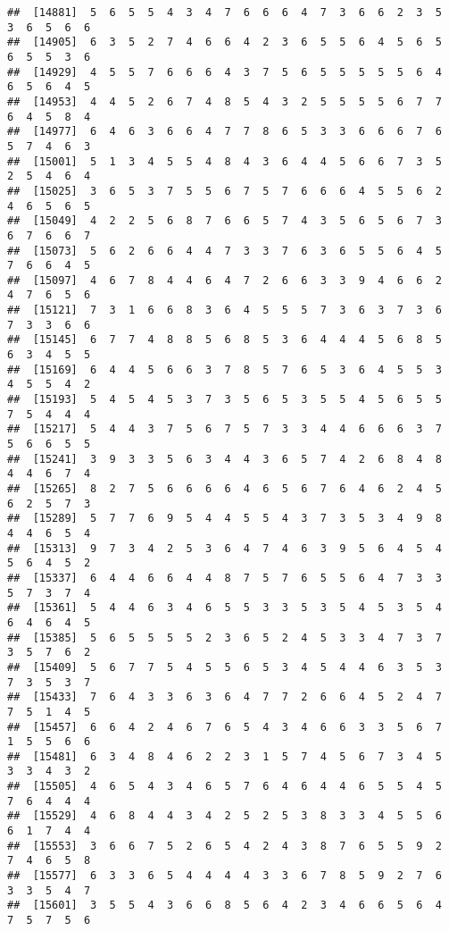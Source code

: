 \documentclass[
]{book}
\begin{document}
\begin{verbatim}
##  [14881]  5  6  5  5  4  3  4  7  6  6  6  4  7  3  6  6  2  3  5  3  6  5  6  6
##  [14905]  6  3  5  2  7  4  6  6  4  2  3  6  5  5  6  4  5  6  5  6  5  5  3  6
##  [14929]  4  5  5  7  6  6  6  4  3  7  5  6  5  5  5  5  5  6  4  6  5  6  4  5
##  [14953]  4  4  5  2  6  7  4  8  5  4  3  2  5  5  5  5  6  7  7  6  4  5  8  4
##  [14977]  6  4  6  3  6  6  4  7  7  8  6  5  3  3  6  6  6  7  6  5  7  4  6  3
##  [15001]  5  1  3  4  5  5  4  8  4  3  6  4  4  5  6  6  7  3  5  2  5  4  6  4
##  [15025]  3  6  5  3  7  5  5  6  7  5  7  6  6  6  4  5  5  6  2  4  6  5  6  5
##  [15049]  4  2  2  5  6  8  7  6  6  5  7  4  3  5  6  5  6  7  3  6  7  6  6  7
##  [15073]  5  6  2  6  6  4  4  7  3  3  7  6  3  6  5  5  6  4  5  7  6  6  4  5
##  [15097]  4  6  7  8  4  4  6  4  7  2  6  6  3  3  9  4  6  6  2  4  7  6  5  6
##  [15121]  7  3  1  6  6  8  3  6  4  5  5  5  7  3  6  3  7  3  6  7  3  3  6  6
##  [15145]  6  7  7  4  8  8  5  6  8  5  3  6  4  4  4  5  6  8  5  6  3  4  5  5
##  [15169]  6  4  4  5  6  6  3  7  8  5  7  6  5  3  6  4  5  5  3  4  5  5  4  2
##  [15193]  5  4  5  4  5  3  7  3  5  6  5  3  5  5  4  5  6  5  5  7  5  4  4  4
##  [15217]  5  4  4  3  7  5  6  7  5  7  3  3  4  4  6  6  6  3  7  5  6  6  5  5
##  [15241]  3  9  3  3  5  6  3  4  4  3  6  5  7  4  2  6  8  4  8  4  4  6  7  4
##  [15265]  8  2  7  5  6  6  6  6  4  6  5  6  7  6  4  6  2  4  5  6  2  5  7  3
##  [15289]  5  7  7  6  9  5  4  4  5  5  4  3  7  3  5  3  4  9  8  4  4  6  5  4
##  [15313]  9  7  3  4  2  5  3  6  4  7  4  6  3  9  5  6  4  5  4  5  6  4  5  2
##  [15337]  6  4  4  6  6  4  4  8  7  5  7  6  5  5  6  4  7  3  3  5  7  3  7  4
##  [15361]  5  4  4  6  3  4  6  5  5  3  3  5  3  5  4  5  3  5  4  6  4  6  4  5
##  [15385]  5  6  5  5  5  5  2  3  6  5  2  4  5  3  3  4  7  3  7  3  5  7  6  2
##  [15409]  5  6  7  7  5  4  5  5  6  5  3  4  5  4  4  6  3  5  3  7  3  5  3  7
##  [15433]  7  6  4  3  3  6  3  6  4  7  7  2  6  6  4  5  2  4  7  7  5  1  4  5
##  [15457]  6  6  4  2  4  6  7  6  5  4  3  4  6  6  3  3  5  6  7  1  5  5  6  6
##  [15481]  6  3  4  8  4  6  2  2  3  1  5  7  4  5  6  7  3  4  5  3  3  4  3  2
##  [15505]  4  6  5  4  3  4  6  5  7  6  4  6  4  4  6  5  5  4  5  7  6  4  4  4
##  [15529]  4  6  8  4  4  3  4  2  5  2  5  3  8  3  3  4  5  5  6  6  1  7  4  4
##  [15553]  3  6  6  7  5  2  6  5  4  2  4  3  8  7  6  5  5  9  2  7  4  6  5  8
##  [15577]  6  3  3  6  5  4  4  4  4  3  3  6  7  8  5  9  2  7  6  3  3  5  4  7
##  [15601]  3  5  5  4  3  6  6  8  5  6  4  2  3  4  6  6  5  6  4  7  5  7  5  6

\end{verbatim}
\end{document}
